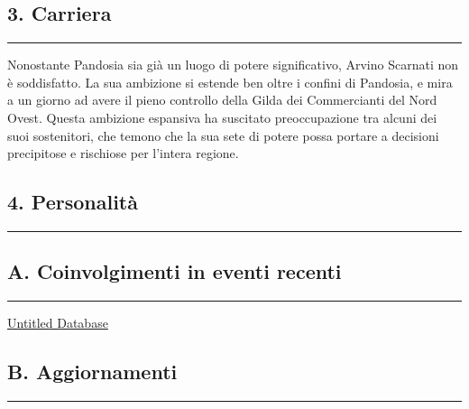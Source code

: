 \subsection{3. Carriera}\label{carriera}

\begin{center}\rule{0.5\linewidth}{0.5pt}\end{center}

Nonostante Pandosia sia già un luogo di potere significativo, Arvino
Scarnati non è soddisfatto. La sua ambizione si estende ben oltre i
confini di Pandosia, e mira a un giorno ad avere il pieno controllo
della Gilda dei Commercianti del Nord Ovest. Questa ambizione espansiva
ha suscitato preoccupazione tra alcuni dei suoi sostenitori, che temono
che la sua sete di potere possa portare a decisioni precipitose e
rischiose per l'intera regione.

\subsection{4. Personalità}\label{personalituxe0}

\begin{center}\rule{0.5\linewidth}{0.5pt}\end{center}

\subsection{A. Coinvolgimenti in eventi
recenti}\label{a.-coinvolgimenti-in-eventi-recenti}

\begin{center}\rule{0.5\linewidth}{0.5pt}\end{center}

\href{Untitled\%20Database\%20eb6e7b85aab64696b2bf163c1157ac16.csv}{Untitled
Database}

\subsection{B. Aggiornamenti}\label{b.-aggiornamenti}

\begin{center}\rule{0.5\linewidth}{0.5pt}\end{center}

\href{Untitled\%20747c95a795934c37af3998a045fd1035.csv}{}
